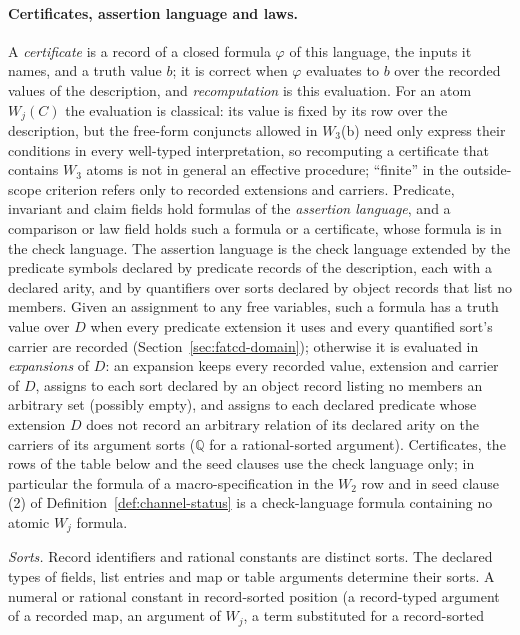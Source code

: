 \documentclass[11pt]{article}
\theoremstyle{definition}
\begin{document}
\paragraph{Certificates, assertion language and laws.} A \emph{certificate} is a record of a closed formula \(\varphi\) of
this language, the inputs it names, and a truth value \(b\); it is correct
when \(\varphi\) evaluates to \(b\) over the recorded values of the
description, and \emph{recomputation} is this evaluation. For an atom \(W_j(C)\) the evaluation is classical: its value is fixed by its row over the description, but the free-form conjuncts allowed in \(W_3\)(b) need only express their conditions in every well-typed interpretation, so recomputing a certificate that contains \(W_3\) atoms is not in general an effective procedure; ``finite'' in the outside-scope criterion refers only to recorded extensions and carriers. Predicate,
invariant and claim fields hold formulas of the \emph{assertion language}, and
a comparison or law field holds such a formula or a certificate, whose formula
is in the check language. The assertion language is the check language extended by the predicate
symbols declared by predicate records of the description, each with a declared
arity, and by quantifiers over sorts declared by object records that list no
members. Given an assignment to any free variables, such a formula has a truth value over \(D\) when every predicate extension it
uses and every quantified sort's carrier are recorded
(Section~\ref{sec:fatcd-domain}); otherwise it is evaluated in \emph{expansions} of \(D\): an expansion keeps every recorded value, extension and carrier of \(D\), assigns to each sort declared by an object record listing no members an arbitrary set (possibly empty), and assigns to each declared predicate whose extension \(D\) does not record an arbitrary relation of its declared arity on the carriers of its argument sorts (\(\mathbb Q\) for a rational-sorted argument). Certificates,
the rows of the table below and the seed clauses use the check language only;
in particular the formula of a macro-specification in the \(W_2\) row and in
seed clause (2) of Definition~\ref{def:channel-status} is a check-language formula containing no atomic \(W_j\)
formula.
\par\emph{Sorts.} Record identifiers and rational constants are distinct sorts. The declared
types of fields, list entries and map or table arguments determine their
sorts. A numeral or rational constant in record-sorted position (a record-typed argument of a
recorded map, an argument of \(W_j\), a term substituted for a record-sorted
\end{document}

